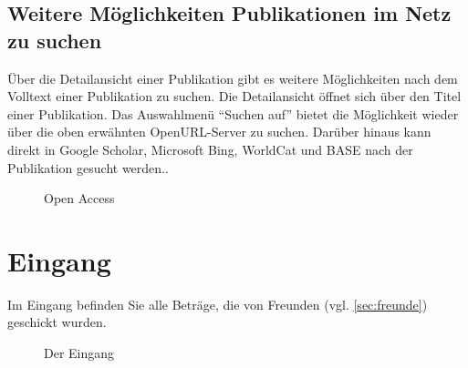 \subsection{Weitere Möglichkeiten Publikationen im Netz zu suchen}%
Über die Detailansicht einer Publikation gibt es weitere Möglichkeiten nach dem Volltext einer Publikation zu suchen. Die Detailansicht öffnet sich über den Titel einer Publikation. Das Auswahlmenü \enquote{Suchen auf} bietet die Möglichkeit wieder über die oben erwähnten OpenURL-Server zu suchen. Darüber hinaus kann direkt in Google Scholar, Microsoft Bing, WorldCat und BASE nach der Publikation gesucht werden..

\begin{figure}[h!]
 \centering
 \caption{Open Access}
 \label{figure033}
\end{figure}

\section{Eingang}
\label{sec:Eingang}
Im Eingang befinden Sie alle Beträge, die von Freunden (vgl. \autoref{sec:freunde}) geschickt wurden.
\begin{figure}[h!]
 \centering
 \caption{Der Eingang}
 \label{figure034}
\end{figure}


